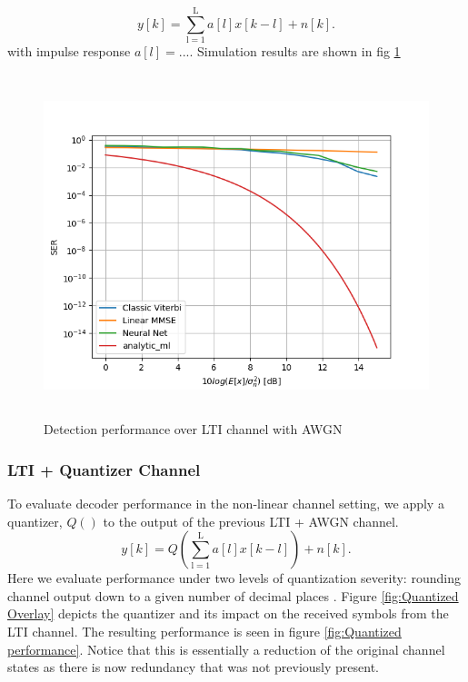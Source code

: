\documentclass[12pt,a4paper]{article}
\begin{document}
\begin{equation*}
y[k] = \sum_{\mathrm{l=1}}^{\mathrm{L}} a[l]x[k-l] + n[k].
\end{equation*}
with impulse response $a[l] = ...$.
Simulation results are shown in fig \ref{fig:LTI performance}
\begin{figure}[H]
	\includegraphics[width=\textwidth,height = 10cm]{results/lti_normal}
		  \caption{Detection performance over LTI channel with AWGN}
	  \label{fig:LTI performance}
\end{figure}

\subsubsection{LTI + Quantizer Channel}

To evaluate decoder performance in the non-linear channel setting, we apply a quantizer, $Q()$ to the output of the previous LTI + AWGN channel.
\begin{equation*}
y[k] = Q(\sum_{\mathrm{l=1}}^{\mathrm{L}} a[l]x[k-l]) + n[k].
\end{equation*}
 Here we evaluate performance under two levels of quantization severity: rounding channel output down to a given number of decimal places . Figure \ref{fig:Quantized Overlay} depicts the quantizer and its impact on the received symbols from the LTI channel. The resulting performance is seen in figure \ref{fig:Quantized performance}. Notice that this is essentially a reduction of the original channel states as there is now redundancy that was not previously present. 
\end{document}
